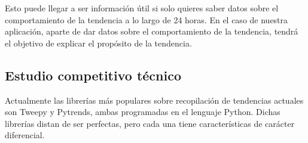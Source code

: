 \vspace{0.3cm}

Esto puede llegar a ser información útil si solo quieres saber datos sobre el comportamiento de la tendencia a lo largo de 24 horas. En el caso de nuestra aplicación, aparte de dar datos sobre el comportamiento de la tendencia, tendrá el objetivo de explicar el propósito de la tendencia.

\subsection{Estudio competitivo técnico}

Actualmente las librerías más populares sobre recopilación de tendencias actuales son Tweepy y Pytrends, ambas programadas en el lenguaje Python. Dichas librerías distan de ser perfectas, pero cada una tiene características de carácter diferencial.

\vspace{0.3cm}

